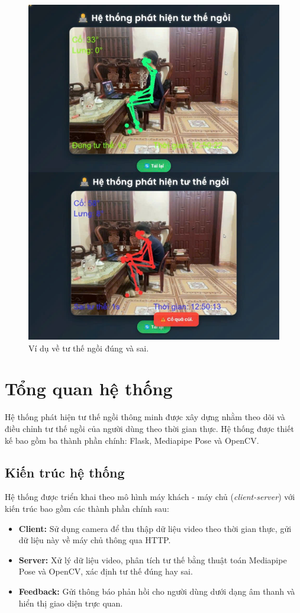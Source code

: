 \documentclass[conference]{IEEEtran}
\begin{document}
\begin{figure}[h]
    \centering
    \includegraphics[width=0.9\linewidth]{images/sitting_posture_example.png}
    \caption{Ví dụ về tư thế ngồi đúng và sai.}
    \label{fig:posture_example}
\end{figure}

\section{Tổng quan hệ thống}
Hệ thống phát hiện tư thế ngồi thông minh được xây dựng nhằm theo dõi và điều chỉnh tư thế ngồi của người dùng theo thời gian thực. Hệ thống được thiết kế bao gồm ba thành phần chính: Flask, Mediapipe Pose và OpenCV.  

\subsection{Kiến trúc hệ thống}
Hệ thống được triển khai theo mô hình máy khách - máy chủ (\textit{client-server}) với kiến trúc bao gồm các thành phần chính sau:
\begin{itemize}
    \item \textbf{Client:} Sử dụng camera để thu thập dữ liệu video theo thời gian thực, gửi dữ liệu này về máy chủ thông qua HTTP.
    \item \textbf{Server:} Xử lý dữ liệu video, phân tích tư thế bằng thuật toán Mediapipe Pose và OpenCV, xác định tư thế đúng hay sai.
    \item \textbf{Feedback:} Gửi thông báo phản hồi cho người dùng dưới dạng âm thanh và hiển thị giao diện trực quan.
\end{itemize}
\end{document}
